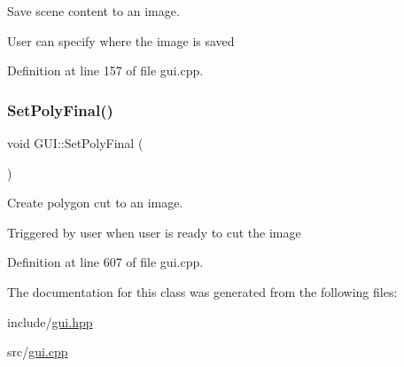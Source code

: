 Save scene content to an image. 

User can specify where the image is saved 

Definition at line 157 of file gui.\+cpp.

\mbox{\label{classGUI_a6bf2d3ef382340365b5693245a2bd955}} 
\subsubsection{\texorpdfstring{Set\+Poly\+Final()}{SetPolyFinal()}}
{\footnotesize\ttfamily void G\+U\+I\+::\+Set\+Poly\+Final (\begin{DoxyParamCaption}{ }\end{DoxyParamCaption})}



Create polygon cut to an image. 

Triggered by user when user is ready to cut the image 

Definition at line 607 of file gui.\+cpp.



The documentation for this class was generated from the following files\+:\begin{DoxyCompactItemize}
\item 
include/\mbox{\hyperlink{gui_8hpp}{gui.\+hpp}}\item 
src/\mbox{\hyperlink{gui_8cpp}{gui.\+cpp}}\end{DoxyCompactItemize}
